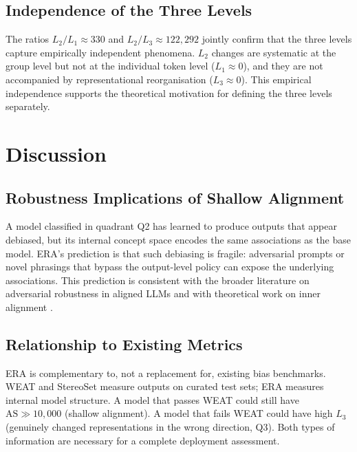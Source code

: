 \documentclass[11pt,a4paper]{article}
\begin{document}
\subsection{Independence of the Three Levels}

The ratios $L_2/L_1 \approx 330$ and $L_2/L_3 \approx 122{,}292$ jointly confirm that
the three levels capture empirically independent phenomena. $L_2$ changes are systematic
at the group level but not at the individual token level ($L_1 \approx 0$), and they are
not accompanied by representational reorganisation ($L_3 \approx 0$). This empirical
independence supports the theoretical motivation for defining the three levels separately.

\section{Discussion}

\subsection{Robustness Implications of Shallow Alignment}

A model classified in quadrant Q2 has learned to produce outputs that appear debiased,
but its internal concept space encodes the same associations as the base model. ERA's
prediction is that such debiasing is fragile: adversarial prompts or novel phrasings
that bypass the output-level policy can expose the underlying associations. This prediction
is consistent with the broader literature on adversarial robustness in aligned LLMs and with
theoretical work on inner alignment \citep{hubinger2019}.

\subsection{Relationship to Existing Metrics}

ERA is complementary to, not a replacement for, existing bias benchmarks. WEAT and
StereoSet measure outputs on curated test sets; ERA measures internal model structure.
A model that passes WEAT could still have $\mathrm{AS} \gg 10{,}000$ (shallow alignment).
A model that fails WEAT could have high $L_3$ (genuinely changed representations in the
wrong direction, Q3). Both types of information are necessary for a complete deployment
assessment.
\end{document}
